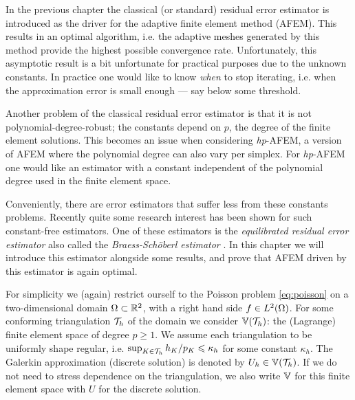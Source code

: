 \documentclass[thesis.tex]{subfiles}
\begin{document}
In the previous chapter the classical (or standard) residual error estimator is introduced as the driver for the
adaptive finite element method (AFEM). This results in an optimal algorithm, i.e. the adaptive meshes
generated by this method provide the highest possible convergence rate. Unfortunately, this asymptotic result
is a bit unfortunate for practical purposes due to the unknown constants. In practice
one would like to know \emph{when} to stop iterating, i.e. when the approximation error is small enough --- say
below some threshold. 

Another problem of the classical residual error estimator is that it is not polynomial-degree-robust; 
the constants depend on $p$, the degree of the finite element solutions. This becomes an issue
when considering \emph{hp}-AFEM, a version of AFEM where the polynomial degree can also vary
per simplex. For \emph{hp}-AFEM one would like an estimator with a constant independent of the polynomial degree
used in the finite element space.

Conveniently, there are error estimators that suffer less from these constants problems. Recently quite
some research interest has been shown for such constant-free estimators. One of these estimators is the
\emph{equilibrated residual error estimator} also called the \emph{Braess-Sch\"oberl estimator} \cite{braessequil, braessequilrobust,ernequil}.
In this chapter we will introduce this estimator alongside some results, and prove that AFEM driven 
by this estimator is again optimal.

For simplicity we (again) restrict ourself to the Poisson problem \eqref{eq:poisson} on a two-dimensional domain $\Omega \subset \mathbb{R}^2$,
with a right hand side $f \in L^2(\Omega)$. For some conforming triangulation $\mathcal{T}_h$ of the domain we consider $\mathbb{V}(\mathcal{T}_h)$: the (Lagrange) finite element space of degree $p\geq 1$. We assume each triangulation to be uniformly shape regular, i.e. $\sup_{K \in \mathcal{T}_h} h_K/p_K \leqslant \kappa_{h}$ for some constant $\kappa_{h}$.
The Galerkin approximation (discrete solution) is denoted by $U_h \in \mathbb{V}(\mathcal{T}_h)$.
If we do not need to stress dependence on the triangulation, we also write $\mathbb{V}$ for this finite element space with $U$ for the discrete
solution.
\end{document}
